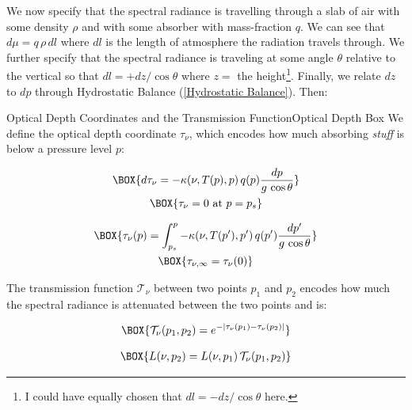 We now specify that the spectral radiance is travelling through a slab of air with some density $\rho$ and with some absorber with mass-fraction $q$. We can see that $d\mu=q\,\rho\,dl$ where $dl$ is the length of atmosphere the radiation travels through. We further specify that the spectral radiance is traveling at some angle $\theta$ relative to the vertical so that $dl=+dz/\cos\theta$ where $z=$ the height\footnote{I could have equally chosen that $dl=-dz/\cos\theta$ here.}. Finally, we relate $dz$ to $dp$ through Hydrostatic Balance (\ref{Hydrostatic Balance}). Then:
\begin{fact}{Optical Depth Coordinates and the Transmission Function}{Optical Depth Box}\label{Optical Depth Box}
    We define the optical depth coordinate $\tau_\nu$, which encodes how much absorbing \textit{stuff} is below a pressure level $p$:

    \begin{minipage}{.5\linewidth}
        \begin{gather}
            \label{Optical Pressure}
            \BOX{d\tau_\nu=-\kappa(\nu,T(p),p)\,q(p)\frac{dp}{g\,\cos\theta}}\\
            \BOX{\tau_\nu=0\text{  at  }p=p_s}
        \end{gather}
    \end{minipage}
    \begin{minipage}{.5\linewidth}
        \begin{gather}
            \BOX{\tau_\nu(p)=\int_{p_s}^p-\kappa(\nu,T(p'),p')\,q(p')\frac{dp'}{g\,\cos\theta}}\\
            \BOX{\tau_{\nu,\infty}=\tau_\nu(0)}
        \end{gather}
    \end{minipage}
    The transmission function $\mathcal{T}_\nu$ between two points $p_1$ and $p_2$ encodes how much the spectral radiance is attenuated between the two points and is:

    \begin{minipage}{.5\linewidth}
        \begin{align}
            \BOX{
                \mathcal{T}_\nu(p_1,p_2)=e^{-|\tau_\nu(p_1)-\tau_\nu(p_2)|}
            }
        \end{align}
    \end{minipage}
    \begin{minipage}{.5\linewidth}
        \begin{align}
            \BOX{
                L(\nu,p_2)=L(\nu,p_1)\,\mathcal{T}_\nu(p_1,p_2)
            }
        \end{align}
    \end{minipage}
\end{fact}

